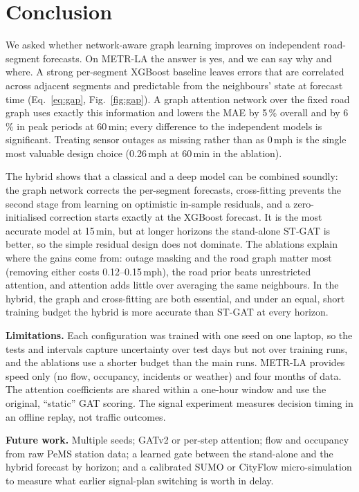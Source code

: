 \section{Conclusion}
\label{sec:conclusion}
We asked whether network-aware graph learning improves on independent road-segment
forecasts. On METR-LA the answer is yes, and we can say why and where. A strong
per-segment XGBoost baseline leaves errors that are correlated across adjacent
segments and predictable from the neighbours' state at forecast time
(Eq.~\eqref{eq:gap}, Fig.~\ref{fig:gap}). A graph attention network over the fixed
road graph uses exactly this information and lowers the MAE by 5\,\% overall and by
6\,\% in peak periods at 60\,min; every difference to the independent models is
significant. Treating sensor outages as missing rather than as 0\,mph is the single
most valuable design choice (0.26\,mph at 60\,min in the ablation).

The hybrid shows that a classical and a deep model can be combined soundly: the
graph network corrects the per-segment forecasts, cross-fitting prevents the
second stage from learning on optimistic in-sample residuals, and a zero-initialised
correction starts exactly at the XGBoost forecast. It is the most accurate model at
15\,min, but at longer horizons the stand-alone ST-GAT is
better, so the simple residual design does not dominate. The ablations explain where
the gains come from: outage masking and the road graph matter most (removing either
costs 0.12--0.15\,mph), the road prior beats unrestricted attention, and attention
adds little over averaging the same neighbours. In the hybrid, the graph and
cross-fitting are both essential, and under an equal, short training budget the
hybrid is more accurate than ST-GAT at every horizon.

\textbf{Limitations.} Each configuration was trained with one seed on one laptop, so
the tests and intervals capture uncertainty over test days but not over training
runs, and the ablations use a shorter budget than the main runs. METR-LA provides
speed only (no flow, occupancy, incidents or weather) and four months of data. The
attention coefficients are shared within a one-hour window and use the original,
``static'' GAT scoring. The signal experiment measures decision timing in an offline
replay, not traffic outcomes.

\textbf{Future work.} Multiple seeds; GATv2 or per-step attention; flow and
occupancy from raw PeMS station data; a learned gate between the stand-alone and the
hybrid forecast by horizon; and a calibrated SUMO or CityFlow micro-simulation to
measure what earlier signal-plan switching is worth in delay.

